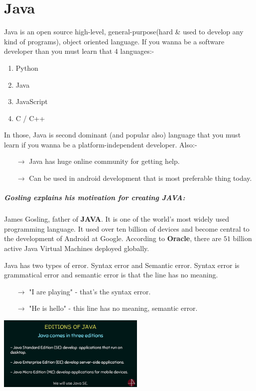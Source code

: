 \documentclass[10 pt]{book}
\begin{document}
\chapter{Java}
Java is an open source high-level, general-purpose(hard \& used to develop any kind of programs), object oriented language. If you wanna be a software developer than you must learn that 4 languages:-
\begin{enumerate}
	\item Python
	\item Java
	\item JavaScript
	\item C / C++
\end{enumerate}
In those, Java is second dominant (and popular also) language that you must learn if you wanna be a platform-independent developer. Also:-
\begin{itemize}
	\item[$\rightarrow$] Java has huge online community for getting help.
	\item[$\rightarrow$] Can be used in android development that is most preferable thing today.
\end{itemize}

\paragraph{Gosling explains his motivation for creating \textbf{JAVA}:}
James Gosling, father of \textbf{JAVA}. It is one of the world's most widely used programming language. It used over ten billion of devices and become central to the development of Android at Google. According to \textbf{Oracle}, there are $51$ billion active Java Virtual Machines deployed globally.

Java has two types of error. Syntax error and Semantic error. Syntax error is grammatical error and semantic error is that the line has no meaning.
\begin{itemize}
	\item[$\rightarrow$] "I are playing" - that's the syntax error.
	\item[$\rightarrow$] "He is hello" - this line has no meaning, semantic error.
\end{itemize}
\begin{center}
	\includegraphics[width=200pt]{Editions of Java.png}
\end{center}
\end{document}
